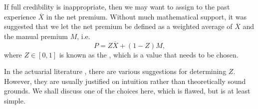 \documentclass[notoc,notitlepage]{tufte-book}
\begin{document}
If full credibility is inappropriate, then we may want to assign  to the past experience $\overline{X}$ in the net premium. Without
much mathematical support, it was suggested that we let the net premium be
defined as a weighted average of $\overline{X}$ and the manual premium $M$,
i.e.
\begin{equation*}
  P = Z \overline{X} + (1 - Z) M,
\end{equation*}
where $Z \in [0, 1]$ is known as the   , which is a
value that needs to be chosen.

In the actuarial literature \cite{klugman2012}, there are various suggestions
for determining $Z$. However, they are usually justified on intuition rather
than theoretically sound grounds. We shall discuss one of the choices here,
which is flawed, but is at least simple.
\end{document}
